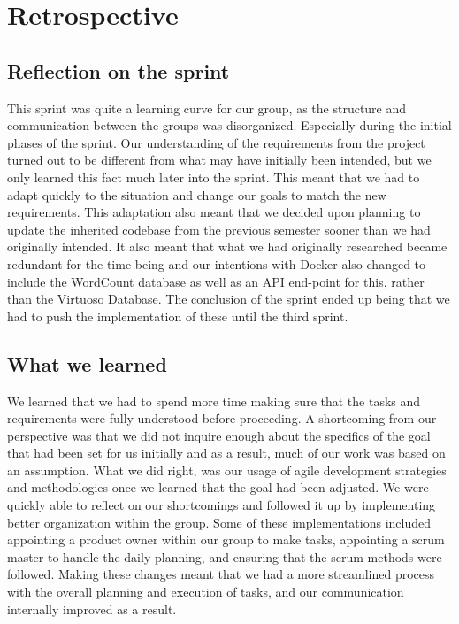 \section{Retrospective}

\subsection{Reflection on the sprint}
This sprint was quite a learning curve for our group, as the structure and communication between the \knox{} groups was disorganized. Especially during the initial phases of the sprint. 
Our understanding of the requirements from the \knox{} project turned out to be different from what may have initially been intended, but we only learned this fact much later into the sprint. 
This meant that we had to adapt quickly to the situation and change our goals to match the new requirements. 
This adaptation also meant that we decided upon planning to update the inherited codebase from the previous semester sooner than we had originally intended. 
It also meant that what we had originally researched became redundant for the time being and our intentions with Docker also changed to include the WordCount database as well as an API end-point for this, rather than the Virtuoso Database. 
The conclusion of the sprint ended up being that we had to push the implementation of these until the third sprint.

\subsection{What we learned}
We learned that we had to spend more time making sure that the tasks and requirements were fully understood before proceeding. 
A shortcoming from our perspective was that we did not inquire enough about the specifics of the goal that had been set for us initially and as a result, much of our work was based on an assumption. 
What we did right, was our usage of agile development strategies and methodologies once we learned that the goal had been adjusted. 
We were quickly able to reflect on our shortcomings and followed it up by implementing better organization within the group. 
Some of these implementations included appointing a product owner within our group to make tasks, appointing a scrum master to handle the daily planning, and ensuring that the scrum methods were followed. 
Making these changes meant that we had a more streamlined process with the overall planning and execution of tasks, and our communication internally improved as a result.

